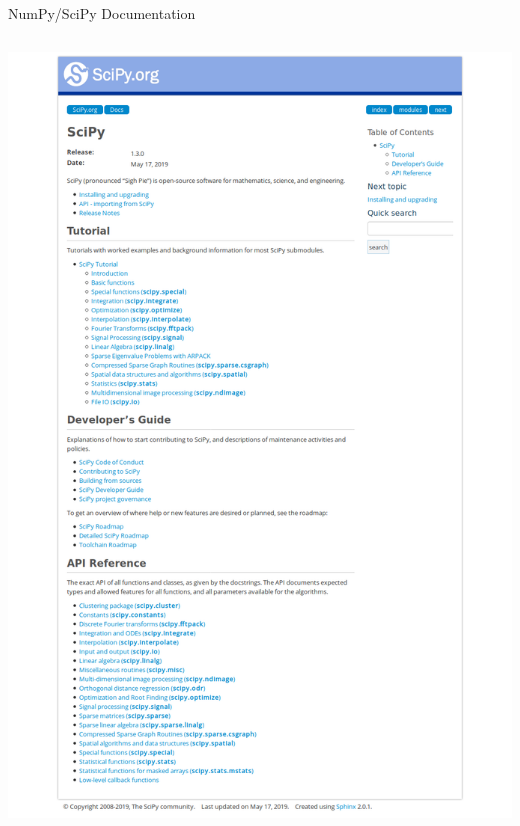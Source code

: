 \documentclass[svgnames]{beamer}
\begin{document}
\begin{frame}{NumPy/SciPy Documentation}
\begin{columns}
\begin{column}{0.55\textwidth}
   \includegraphics[width=\textwidth]{docs-scipy}
  \end{column}%
 \end{columns}
\end{frame}
\end{document}
